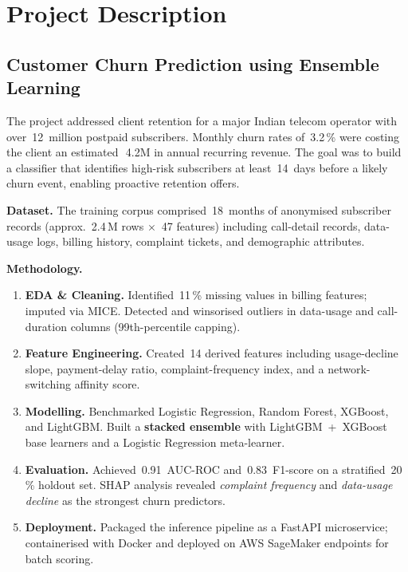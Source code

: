 \section{Project Description}

\subsection{Customer Churn Prediction using Ensemble Learning}

The project addressed client retention for a major Indian telecom operator with
over~12~million postpaid subscribers. Monthly churn rates of~3.2\,\% were costing
the client an estimated~\texteuro\,4.2M in annual recurring revenue. The goal was
to build a classifier that identifies high-risk subscribers at least~14~days before
a likely churn event, enabling proactive retention offers.

\textbf{Dataset.} The training corpus comprised~18~months of anonymised subscriber
records (approx.\ 2.4\,M rows $\times$~47 features) including call-detail records,
data-usage logs, billing history, complaint tickets, and demographic attributes.

\textbf{Methodology.}
\begin{enumerate}[leftmargin=18pt,itemsep=2pt,topsep=4pt]
    \item \textbf{EDA \& Cleaning.} Identified~11\,\% missing values in billing
          features; imputed via MICE. Detected and winsorised outliers in
          data-usage and call-duration columns (99th-percentile capping).
    \item \textbf{Feature Engineering.} Created~14 derived features including
          usage-decline slope, payment-delay ratio, complaint-frequency index, and
          a network-switching affinity score.
    \item \textbf{Modelling.} Benchmarked Logistic Regression, Random Forest,
          XGBoost, and LightGBM. Built a \textbf{stacked ensemble} with
          LightGBM~+~XGBoost base learners and a Logistic Regression meta-learner.
    \item \textbf{Evaluation.} Achieved~0.91~AUC-ROC and~0.83~F1-score on a
          stratified~20\,\% holdout set. SHAP analysis revealed \emph{complaint
          frequency} and \emph{data-usage decline} as the strongest churn
          predictors.
    \item \textbf{Deployment.} Packaged the inference pipeline as a FastAPI
          microservice; containerised with Docker and deployed on AWS SageMaker
          endpoints for batch scoring.
\end{enumerate}

